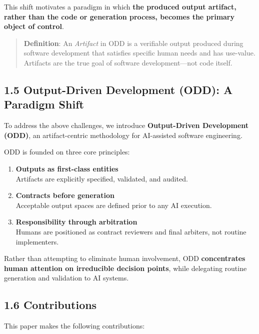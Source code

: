 \documentclass[
]{article}
\begin{document}
This shift motivates a paradigm in which \textbf{the produced output
artifact, rather than the code or generation process, becomes the
primary object of control}.

\begin{quote}
\textbf{Definition}: An \emph{Artifact} in ODD is a verifiable output
produced during software development that satisfies specific human needs
and has use-value. Artifacts are the true goal of software
development---not code itself.
\end{quote}

\hypertarget{15-output-driven-development-odd-a-paradigm-shift}{%
\subsection{1.5 Output-Driven Development (ODD): A Paradigm
Shift}\label{15-output-driven-development-odd-a-paradigm-shift}}

To address the above challenges, we introduce \textbf{Output-Driven
Development (ODD)}, an artifact-centric methodology for AI-assisted
software engineering.

ODD is founded on three core principles:

\begin{enumerate}
\def\labelenumi{\arabic{enumi}.}
\item
  \textbf{Outputs as first-class entities}\\
  Artifacts are explicitly specified, validated, and audited.
\item
  \textbf{Contracts before generation}\\
  Acceptable output spaces are defined prior to any AI execution.
\item
  \textbf{Responsibility through arbitration}\\
  Humans are positioned as contract reviewers and final arbiters, not
  routine implementers.
\end{enumerate}

Rather than attempting to eliminate human involvement, ODD
\textbf{concentrates human attention on irreducible decision points},
while delegating routine generation and validation to AI systems.

\hypertarget{16-contributions}{%
\subsection{1.6 Contributions}\label{16-contributions}}

This paper makes the following contributions:
\end{document}
